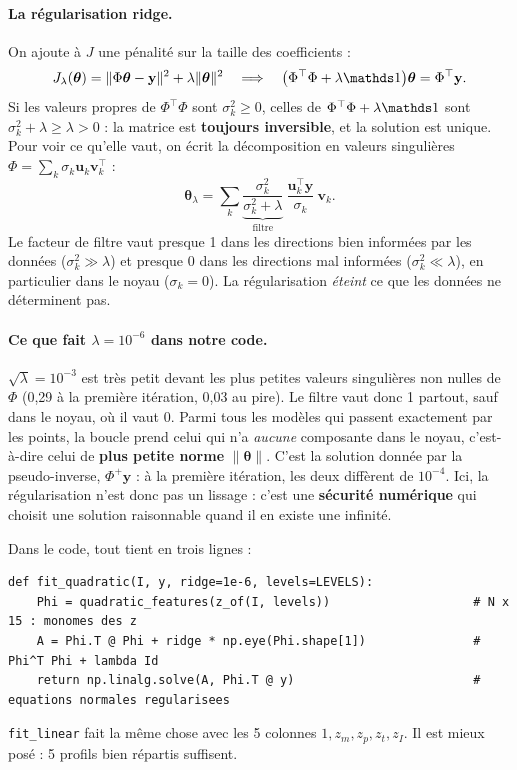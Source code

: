 \paragraph{La régularisation ridge.} On ajoute à $J$ une pénalité sur la taille des coefficients :
\[ J_\lambda(\boldsymbol\theta)=\|\Phi\boldsymbol\theta-\mathbf y\|^2+\lambda\|\boldsymbol\theta\|^2\quad\Longrightarrow\quad\big(\Phi^\top\Phi+\lambda\Id\big)\boldsymbol\theta=\Phi^\top\mathbf y. \]
Si les valeurs propres de $\Phi^\top\Phi$ sont $\sigma_k^2\ge0$, celles de $\Phi^\top\Phi+\lambda\Id$ sont $\sigma_k^2+\lambda\ge\lambda>0$ : la matrice est \textbf{toujours inversible}, et la solution est unique. Pour voir ce qu'elle vaut, on écrit la décomposition en valeurs singulières $\Phi=\sum_k\sigma_k\mathbf u_k\mathbf v_k^\top$ :
\[ \boldsymbol\theta_\lambda=\sum_k\underbrace{\frac{\sigma_k^2}{\sigma_k^2+\lambda}}_{\text{filtre}}\ \frac{\mathbf u_k^\top\mathbf y}{\sigma_k}\ \mathbf v_k. \]
Le facteur de filtre vaut presque 1 dans les directions bien informées par les données ($\sigma_k^2\gg\lambda$) et presque 0 dans les directions mal informées ($\sigma_k^2\ll\lambda$), en particulier dans le noyau ($\sigma_k=0$). La régularisation \emph{éteint} ce que les données ne déterminent pas.

\paragraph{Ce que fait $\lambda=10^{-6}$ dans notre code.} $\sqrt\lambda=10^{-3}$ est très petit devant les plus petites valeurs singulières non nulles de $\Phi$ (0,29 à la première itération, 0,03 au pire). Le filtre vaut donc 1 partout, sauf dans le noyau, où il vaut 0. Parmi tous les modèles qui passent exactement par les points, la boucle prend celui qui n'a \emph{aucune} composante dans le noyau, c'est-à-dire celui de \textbf{plus petite norme} $\|\boldsymbol\theta\|$. C'est la solution donnée par la pseudo-inverse, $\Phi^+\mathbf y$ : à la première itération, les deux diffèrent de $10^{-4}$. Ici, la régularisation n'est donc pas un lissage : c'est une \textbf{sécurité numérique} qui choisit une solution raisonnable quand il en existe une infinité.

Dans le code, tout tient en trois lignes :
\begin{lstlisting}
def fit_quadratic(I, y, ridge=1e-6, levels=LEVELS):
    Phi = quadratic_features(z_of(I, levels))                    # N x 15 : monomes des z
    A = Phi.T @ Phi + ridge * np.eye(Phi.shape[1])               # Phi^T Phi + lambda Id
    return np.linalg.solve(A, Phi.T @ y)                         # equations normales regularisees
\end{lstlisting}
\texttt{fit\_linear} fait la même chose avec les 5 colonnes $1,z_m,z_p,z_t,z_I$. Il est mieux posé : 5 profils bien répartis suffisent.


